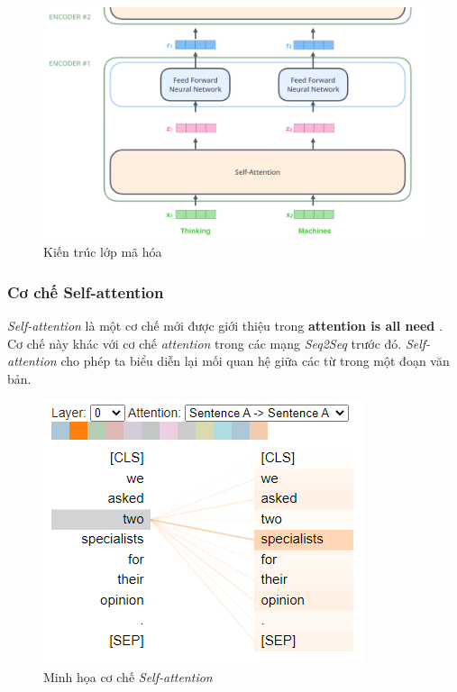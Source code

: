 \begin{figure}[H]
    \begin{center}
        \includegraphics[scale=0.35]{images/encoder}
        \caption{Kiến trúc lớp mã hóa\cite{illustrated.transformer}}
        \label{fig:encoder}
    \end{center}
\end{figure}


\subsubsection{Cơ chế Self-attention}

\textit{Self-attention} là một cơ chế mới được giới thiệu trong \textbf{attention is all need} \cite{transformer}. Cơ chế này khác với cơ chế \textit{attention} trong các mạng \textit{Seq2Seq} trước đó. \textit{Self-attention} cho phép ta biểu diễn lại mối quan hệ giữa các từ trong một đoạn văn bản.

\begin{figure}[H]
    \begin{center}
        \includegraphics[scale=1.0]{images/self-attention}
        \caption{Minh họa cơ chế \textit{Self-attention}\cite{illustrated.transformer}}
        \label{fig:self-attention}
    \end{center}
\end{figure}

